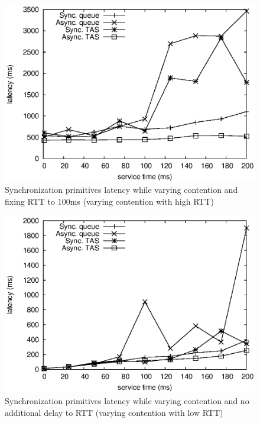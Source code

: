 \begin{figure}[ht]
\centering
\includegraphics[scale=0.68]{img/primitives_vary-contention_rtt-100.eps}
\caption{Synchronization primitives latency while varying contention and fixing RTT to 100ms (varying contention with high RTT)}
\label{fig:primitives_vary_contention_rtt100}
\end{figure}

\begin{figure}[ht]
\centering
\includegraphics[scale=0.68]{img/primitives_vary-contention_rtt-0.eps}
\caption{Synchronization primitives latency while varying contention and no additional delay to RTT (varying contention with low RTT)}
\label{fig:primitives_vary_contention_rtt0}
\end{figure}

